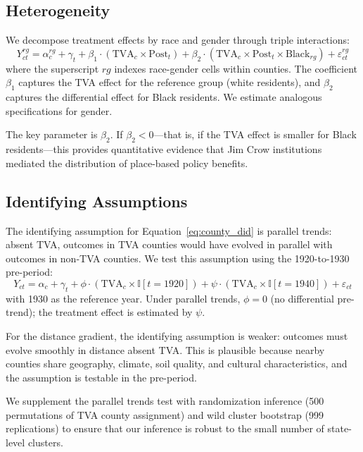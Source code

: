 \documentclass[12pt]{article}
\newcommand{\ind}{\mathbb{I}}
\begin{document}
\subsection{Heterogeneity}

We decompose treatment effects by race and gender through triple interactions:
\begin{equation}\label{eq:heterogeneity}
Y_{ct}^{rg} = \alpha_{c}^{rg} + \gamma_t + \beta_1 \cdot (\text{TVA}_c \times \text{Post}_t) + \beta_2 \cdot (\text{TVA}_c \times \text{Post}_t \times \text{Black}_{rg}) + \varepsilon_{ct}^{rg}
\end{equation}
where the superscript $rg$ indexes race-gender cells within counties. The coefficient $\beta_1$ captures the TVA effect for the reference group (white residents), and $\beta_2$ captures the differential effect for Black residents. We estimate analogous specifications for gender.

The key parameter is $\beta_2$. If $\beta_2 < 0$---that is, if the TVA effect is smaller for Black residents---this provides quantitative evidence that Jim Crow institutions mediated the distribution of place-based policy benefits.

\subsection{Identifying Assumptions}

The identifying assumption for Equation~\eqref{eq:county_did} is parallel trends: absent TVA, outcomes in TVA counties would have evolved in parallel with outcomes in non-TVA counties. We test this assumption using the 1920-to-1930 pre-period:
\begin{equation}\label{eq:pretrend}
Y_{ct} = \alpha_c + \gamma_t + \phi \cdot (\text{TVA}_c \times \ind[t = 1920]) + \psi \cdot (\text{TVA}_c \times \ind[t = 1940]) + \varepsilon_{ct}
\end{equation}
with 1930 as the reference year. Under parallel trends, $\phi = 0$ (no differential pre-trend); the treatment effect is estimated by $\psi$.

For the distance gradient, the identifying assumption is weaker: outcomes must evolve smoothly in distance absent TVA. This is plausible because nearby counties share geography, climate, soil quality, and cultural characteristics, and the assumption is testable in the pre-period.

We supplement the parallel trends test with randomization inference (500 permutations of TVA county assignment) and wild cluster bootstrap (999 replications) to ensure that our inference is robust to the small number of state-level clusters.
\end{document}
